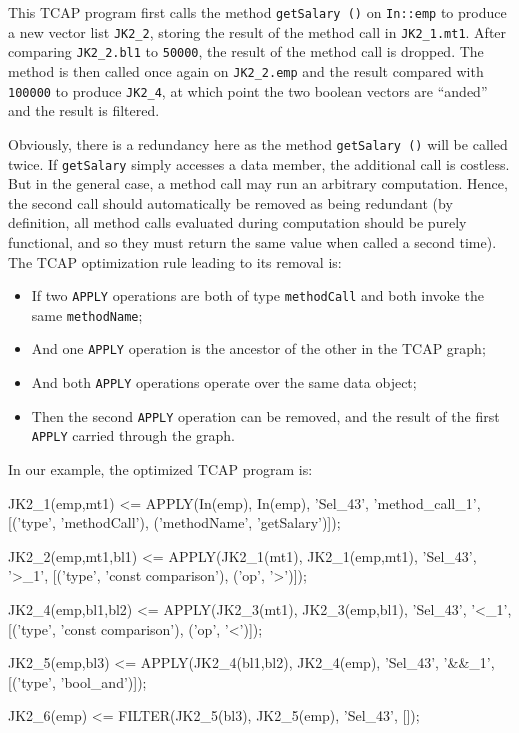 \noindent
This TCAP program first calls the method \texttt{getSalary ()} on \texttt{In::emp} to produce a new vector list \texttt{JK2\_2}, storing the result
of the method call in \texttt{JK2\_1.mt1}.  After comparing \texttt{JK2\_2.bl1} to \texttt{50000}, the result of the method call is dropped.
The method is then called once again on \texttt{JK2\_2.emp} and the result compared with \texttt{100000} to produce \texttt{JK2\_4}, at which 
point the two boolean vectors are ``anded'' and the result is filtered.

Obviously, there is a redundancy here as the method \texttt{getSalary ()} will be called twice.
If \texttt{getSalary} simply accesses a data member, the additional
call is costless.  But in the general case, a method call may run an arbitrary
computation.  Hence, the second call should automatically be removed as being redundant 
(by definition, all method calls evaluated during computation should
be purely functional, and so they must return the same value when called a second time).
The TCAP optimization rule leading to its removal is:

\begin{itemize}
\vspace{-5 pt}
\item If two \texttt{APPLY} operations are both of type \texttt{methodCall} and both invoke the same \texttt{methodName};
\vspace{-5 pt}
\item And one \texttt{APPLY} operation is the ancestor of the other in the TCAP graph;
\vspace{-5 pt}
\item And both \texttt{APPLY} operations operate over the same data object;
\vspace{-5 pt}
\item Then the second \texttt{APPLY} operation can be removed, and the result of the first \texttt{APPLY} carried through the graph.
\end{itemize}

\noindent
In our example, the
optimized
TCAP program is:

\begin{codesmall}
JK2_1(emp,mt1) <= APPLY(In(emp), In(emp), 'Sel_43', 'method_call_1',
   [('type', 'methodCall'), ('methodName', 'getSalary')]);

JK2_2(emp,mt1,bl1) <= APPLY(JK2_1(mt1), JK2_1(emp,mt1), 'Sel_43', '>_1', 
  [('type', 'const comparison'), ('op', '>')]);

JK2_4(emp,bl1,bl2) <= APPLY(JK2_3(mt1), JK2_3(emp,bl1), 'Sel_43', '<_1', 
  [('type', 'const comparison'), ('op', '<')]);

JK2_5(emp,bl3) <= APPLY(JK2_4(bl1,bl2), JK2_4(emp), 'Sel_43', '&&_1', 
  [('type', 'bool_and')]);

JK2_6(emp) <= FILTER(JK2_5(bl3), JK2_5(emp), 'Sel_43', []);
  
\end{codesmall}

